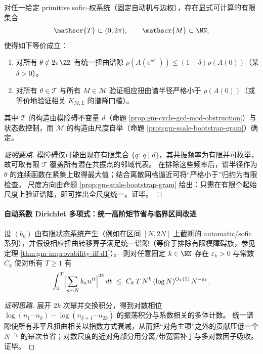 \begin{theorem}\label{thm:gm-finite-verification-uniform-gap}
对任一给定 primitive sofic--权系统（固定自动机与边权），存在显式可计算的有限集合
\[
\mathscr{T}\subset(0,2\pi),\qquad \mathscr{M}\subset\NN,
\]
使得如下等价成立：
\begin{enumerate}
  \item 对所有 \(\theta\notin 2\pi\ZZ\) 有统一扭曲谱隙 \(\rho(A(e^{i\theta\cdot}))\le (1-\delta)\rho(A(0))\)（某 \(\delta>0\)）。
  \item 对所有 \(\theta\in\mathscr{T}\) 与所有 \(M\in\mathscr{M}\) 验证相应扭曲谱半径严格小于 \(\rho(A(0))\)（或等价地验证相关 \(K_{M,L}\) 的谱降门槛）。
\end{enumerate}
其中 \(\mathscr{T}\) 的构造由模障碍不变量 \(d\)（命题 \ref{prop:gm-cycle-gcd-mod-obstruction}）与状态数控制，而 \(\mathscr{M}\) 的构造由尺度自举（命题 \ref{prop:gm-scale-bootstrap-gram}）确定。
\end{theorem}

\begin{proof}[证明要点]
模障碍仅可能出现在有限集合 \(\{q:\ q\mid d\}\)，其共振频率为有限并可枚举，故可取有限 \(\mathscr{T}\) 覆盖所有潜在共振点的邻域代表。
在排除这些频率后，谱半径作为 \(\theta\) 的连续函数在紧集上取得最大值；结合离散网格逼近可将“严格小于”归约为有限检查。
尺度方向由命题 \ref{prop:gm-scale-bootstrap-gram} 给出：只需在有限个起始尺度上验证谱降，即可推出全尺度统一。证毕。
\end{proof}

\paragraph{自动系数 Dirichlet 多项式：统一高阶矩节省与临界区间改进}
\begin{theorem}\label{thm:gm-automatic-dirichlet-moment-bound}
设 \((b_n)\) 由有限状态系统产生（例如在区间 \([N,2N]\) 上截断的 automatic/sofic 系列），并假设相应扭曲转移算子满足统一谱隙（等价于排除有限模障碍族，参见定理 \ref{thm:gm-improvability-iff-d1}）。
则对任意固定 \(k\in\NN\) 存在 \(\varepsilon_k>0\) 与常数 \(C_k\) 使对所有 \(T\ge 1\) 有
\[
\int_0^T\Bigl|\sum_{n\sim N} b_n n^{it}\Bigr|^{2k}\,dt
\ \le\
C_k\,T\,N^{k}\,(\log N)^{O_k(1)}\,N^{-\varepsilon_k}.
\]
\end{theorem}

\begin{proof}[证明思路]
展开 \(2k\) 次幂并交换积分，得到对数相位 \(\log(n_1\cdots n_k)-\log(n_{k+1}\cdots n_{2k})\) 的振荡积分与系数相关的多体计数。
统一谱隙使所有非平凡扭曲相关以指数方式衰减，从而把“对角主项”之外的贡献压低一个 \(N^{-\varepsilon_k}\) 的幂次节省；对数尺度的近对角部分用分离/带宽窗补丁与多对数因子吸收。证毕。
\end{proof}

